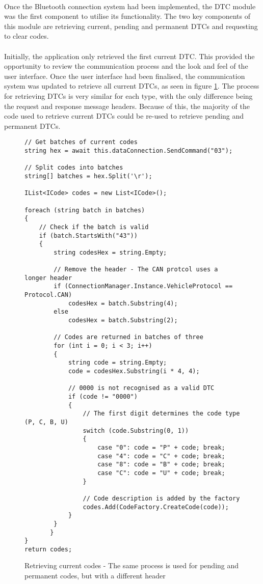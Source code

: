 	\paragraph{}{
	Once the Bluetooth connection system had been implemented, the DTC module was the first component to utilise its functionality. The two key components of this module are retrieving current, pending and permanent DTCs and requesting to clear codes.
	}
	\paragraph{}{
	Initially, the application only retrieved the first current DTC. This provided the opportunity to review the communication process and the look and feel of the user interface. Once the user interface had been finalised, the communication system was updated to retrieve all current DTCs, as seen in figure \ref{code:DTCModuleCodes}. The process for retrieving DTCs is very similar for each type, with the only difference being the request and response message headers. Because of this, the majority of the code used to retrieve current DTCs could be re-used to retrieve pending and permanent DTCs.
	}
	
	\begin{figure}[h]
		\begin{lstlisting}
// Get batches of current codes
string hex = await this.dataConnection.SendCommand("03");

// Split codes into batches
string[] batches = hex.Split('\r');

IList<ICode> codes = new List<ICode>();

foreach (string batch in batches)
{
	// Check if the batch is valid
    if (batch.StartsWith("43"))
    {        
        string codesHex = string.Empty;
        		
		// Remove the header - The CAN protcol uses a longer header
		if (ConnectionManager.Instance.VehicleProtocol == Protocol.CAN)
			codesHex = batch.Substring(4);
        else
			codesHex = batch.Substring(2);

        // Codes are returned in batches of three
		for (int i = 0; i < 3; i++)
		{
			string code = string.Empty;
			code = codesHex.Substring(i * 4, 4);

			// 0000 is not recognised as a valid DTC
			if (code != "0000")
			{
				// The first digit determines the code type (P, C, B, U)
				switch (code.Substring(0, 1))
				{
					case "0": code = "P" + code; break;
					case "4": code = "C" + code; break;
					case "8": code = "B" + code; break;
					case "C": code = "U" + code; break;						
				}					
				
				// Code description is added by the factory
				codes.Add(CodeFactory.CreateCode(code));
			}
		}
       }
}
return codes;
		\end{lstlisting}
		\caption{Retrieving current codes - The same process is used for pending and permanent codes, but with a different header}
		\label{code:DTCModuleCodes}
	\end{figure}
			
